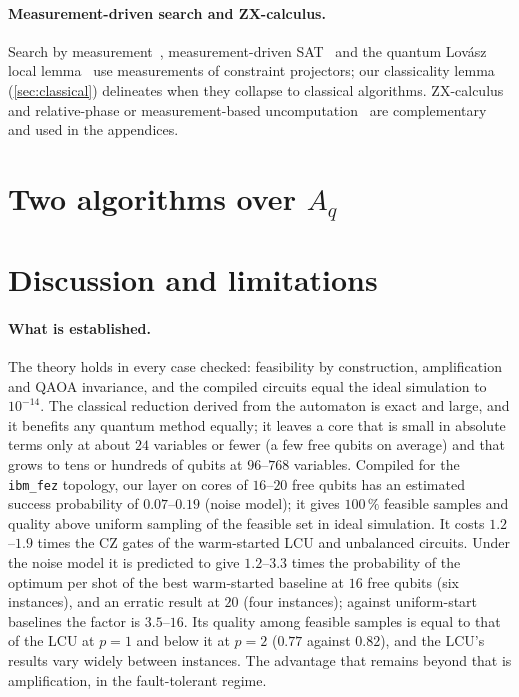 \documentclass[10pt,twocolumn]{article}
\begin{document}
\paragraph{Measurement-driven search and ZX-calculus.} Search by measurement~\cite{childs2002,mizel2009,andres2022,prabhat2026}, measurement-driven SAT~\cite{benjamin2017,zhang2024zeno} and the quantum Lov\'asz local lemma~\cite{schwarz2013,gilyen2017} use measurements of constraint projectors; our classicality lemma (\cref{sec:classical}) delineates when they collapse to classical algorithms. ZX-calculus~\cite{coecke2011,duncan2020,kissinger2020tcount,pyzx} and relative-phase or measurement-based uncomputation~\cite{gidney2018} are complementary and used in the appendices.


\section{Two algorithms over \texorpdfstring{$A_q$}{Aq}}\label{sec:algorithms}






\section{Discussion and limitations}\label{sec:discussion}
\paragraph{What is established.} The theory holds in every case checked: feasibility by construction, amplification and QAOA invariance, and the compiled circuits equal the ideal simulation to $10^{-14}$. The classical reduction derived from the automaton is exact and large, and it benefits any quantum method equally; it leaves a core that is small in absolute terms only at about $24$ variables or fewer (a few free qubits on average) and that grows to tens or hundreds of qubits at $96$--$768$ variables. Compiled for the \texttt{ibm\_fez} topology, our layer on cores of $16$--$20$ free qubits has an estimated success probability of $0.07$--$0.19$ (noise model); it gives $100\,\%$ feasible samples and quality above uniform sampling of the feasible set in ideal simulation. It costs $1.2$--$1.9$ times the CZ gates of the warm-started LCU and unbalanced circuits. Under the noise model it is predicted to give $1.2$--$3.3$ times the probability of the optimum per shot of the best warm-started baseline at $16$ free qubits (six instances), and an erratic result at $20$ (four instances); against uniform-start baselines the factor is $3.5$--$16$. Its quality among feasible samples is equal to that of the LCU at $p=1$ and below it at $p=2$ ($0.77$ against $0.82$), and the LCU's results vary widely between instances. The advantage that remains beyond that is amplification, in the fault-tolerant regime.
\end{document}

